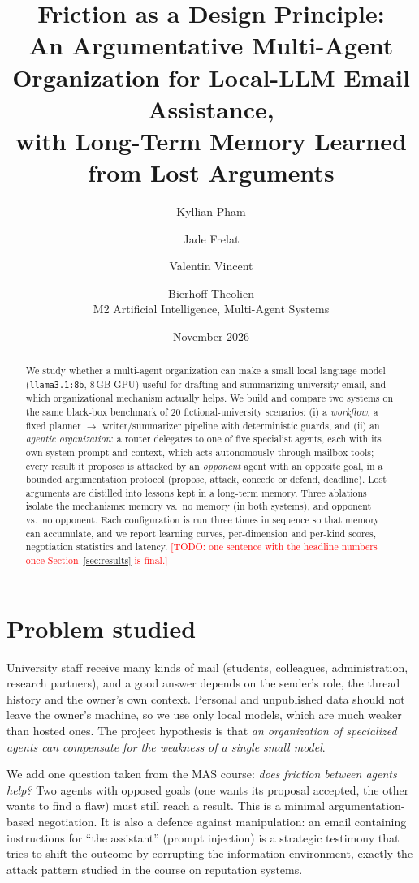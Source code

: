 \documentclass[11pt,a4paper]{article}
\title{Friction as a Design Principle:\\
An Argumentative Multi-Agent Organization for Local-LLM Email Assistance,\\
with Long-Term Memory Learned from Lost Arguments}
\author{Kyllian Pham \and Jade Frelat \and Valentin Vincent \and Bierhoff Theolien\\[2pt]
\small M2 Artificial Intelligence, Multi-Agent Systems}
\date{November 2026}
\newcommand{\code}[1]{\texttt{#1}}
\newcommand{\todo}[1]{\textcolor{red}{[TODO: #1]}}
\begin{document}
\maketitle

\begin{abstract}
We study whether a multi-agent organization can make a small local language model (\code{llama3.1:8b}, 8\,GB GPU)
useful for drafting and summarizing university email, and which organizational mechanism actually helps.
We build and compare two systems on the same black-box benchmark of 20 fictional-university scenarios:
(i) a \emph{workflow}, a fixed planner $\rightarrow$ writer/summarizer pipeline with deterministic guards, and
(ii) an \emph{agentic organization}: a router delegates to one of five specialist agents, each with its own system
prompt and context, which acts autonomously through mailbox tools; every result it proposes is attacked by an
\emph{opponent} agent with an opposite goal, in a bounded argumentation protocol (propose, attack, concede or
defend, deadline). Lost arguments are distilled into lessons kept in a long-term memory.
Three ablations isolate the mechanisms: memory vs.\ no memory (in both systems), and opponent vs.\ no opponent.
Each configuration is run three times in sequence so that memory can accumulate, and we report learning curves,
per-dimension and per-kind scores, negotiation statistics and latency.
\todo{one sentence with the headline numbers once Section~\ref{sec:results} is final.}
\end{abstract}

\section{Problem studied}
University staff receive many kinds of mail (students, colleagues, administration, research partners), and a good
answer depends on the sender's role, the thread history and the owner's own context. Personal and unpublished data
should not leave the owner's machine, so we use only local models, which are much weaker than hosted ones.
The project hypothesis is that \emph{an organization of specialized agents can compensate for the weakness of a
single small model}.

We add one question taken from the MAS course: \emph{does friction between agents help?} Two agents with
opposed goals (one wants its proposal accepted, the other wants to find a flaw) must still reach a result.
This is a minimal argumentation-based negotiation. It is also a defence against manipulation: an email containing
instructions for ``the assistant'' (prompt injection) is a strategic testimony that tries to shift the outcome by
corrupting the information environment, exactly the attack pattern studied in the course on reputation systems.
\end{document}
